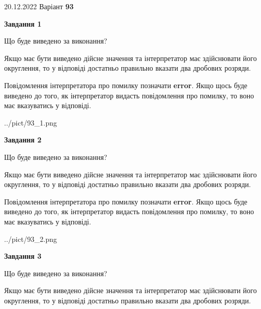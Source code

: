 \documentclass[12pt, ukrainian]{article}
\begin{document}
{20.12.2022 Варіант \No \textbf { 93 }\par}
{
\begin {Large}

{\begin {center}\textbf{Завдання 1}\end {center}}\par
Що буде виведено за виконання? \par

Якщо має бути виведено дійсне значення та інтерпретатор має здійснювати його округлення, 
то у відповіді достатньо правильно вказати два дробових розряди.

Повідомлення інтерпретатора про помилку позначати \textbf{error}.
Якщо щось буде виведено до того, як інтерпретатор видасть повідомлення про помилку, 
то воно має вказуватись у відповіді. \par

\begin{center}
	{../pict/93_1.png}
\end{center}
\newpage

{\begin {center}\textbf{Завдання 2}\end {center}}\par
Що буде виведено за виконання? \par

Якщо має бути виведено дійсне значення та інтерпретатор має здійснювати його округлення, 
то у відповіді достатньо правильно вказати два дробових розряди.

Повідомлення інтерпретатора про помилку позначати \textbf{error}.
Якщо щось буде виведено до того, як інтерпретатор видасть повідомлення про помилку, 
то воно має вказуватись у відповіді. \par

\begin{center}
	{../pict/93_2.png}
\end{center}
\newpage

{\begin {center}\textbf{Завдання 3}\end {center}}\par
Що буде виведено за виконання? \par

Якщо має бути виведено дійсне значення та інтерпретатор має здійснювати його округлення, 
то у відповіді достатньо правильно вказати два дробових розряди.


\end{Large}}
\end{document}
